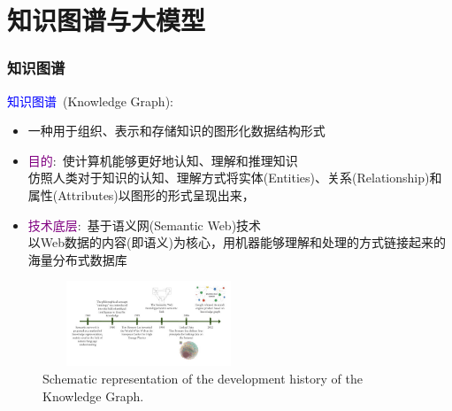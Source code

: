 %

\section{知识图谱与大模型}
\frame
{
	\frametitle{知识图谱}
	\textcolor{blue}{知识图谱}~\textrm{(Knowledge Graph)}:
	\begin{itemize}
		\item 一种用于组织、表示和存储知识的图形化数据结构形式
		\item \textcolor{purple}{目的}:~使计算机能够更好地认知、理解和推理知识\\
			仿照人类对于知识的认知、理解方式将实体\textrm{(Entities)}、关系\textrm{(Relationship)}和属性\textrm{(Attributes)}以图形的形式呈现出来，
		\item \textcolor{purple}{技术底层}:~基于语义网\textrm{(Semantic Web)}技术\\
			以\textrm{Web}数据的内容(即语义)为核心，用机器能够理解和处理的方式链接起来的海量分布式数据库
	\end{itemize}
\begin{figure}[h!]
\centering
\vskip -8pt
\includegraphics[height=1.00in,width=2.50in,viewport=0 0 160 75,clip]{Figures/Development-history-of-the-knowledge-graph.jpg}
\caption{\tiny\textrm{Schematic representation of the development history of the Knowledge Graph.}}%
\label{Fig:Knowledge-history}
\end{figure}
}

